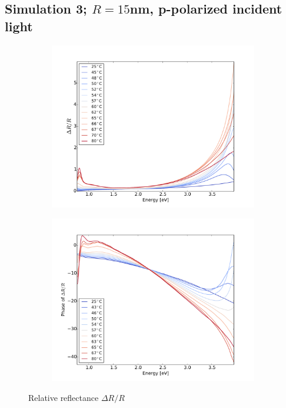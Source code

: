 \subsection{Simulation 3; $R = 15$nm, p-polarized incident light}
%
\begin{figure}
    \centering
    \begin{subfigure}[b]{0.49\textwidth}
        \centering
        \includegraphics[width=\textwidth]{Results/Sim3/dR.pdf}
        \caption{}
        \label{fig:}
    \end{subfigure}
    \begin{subfigure}[b]{0.49\textwidth}
        \centering
        \includegraphics[width=\textwidth]{Results/Sim3/dRphase.pdf}
        \caption{}
        \label{fig:}
    \end{subfigure}
    \caption{Relative reflectance $\Delta R/R$}
    \label{fig:1}
\end{figure}
